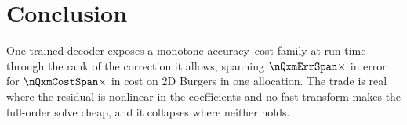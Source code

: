\section{Conclusion}
\label{sec:conclusion}

One trained decoder exposes a monotone accuracy--cost family at run time through
the rank of the correction it allows, spanning $\nQxmErrSpan\times$ in error for
$\nQxmCostSpan\times$ in cost on 2D Burgers in one allocation. The trade is real
where the residual is nonlinear in the coefficients and no fast transform makes
the full-order solve cheap, and it collapses where neither holds.
